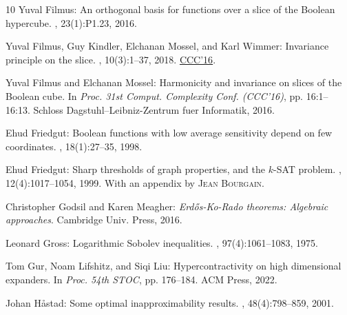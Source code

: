 \documentclass[11pt]{article}
\begin{document}
\begin{thebibliography}{10}
{\sc Yuval Filmus}: An orthogonal basis for functions over a slice of the
  {Boolean} hypercube.
, 23(1):P1.23, 2016.
\newblock [\epfmtdoi{10.37236/4567}]

{\sc Yuval Filmus, Guy Kindler, Elchanan Mossel, and Karl Wimmer}: Invariance
  principle on the slice.
, 10(3):1--37, 2018.
\newblock \prelim \href{https://doi.org/10.4230/LIPIcs.CCC.2016.15}{CCC'16}.
\newblock [\epfmtdoi{10.1145/3186590}]

{\sc Yuval Filmus and Elchanan Mossel}: Harmonicity and invariance on slices of
  the {Boolean} cube.
\newblock In {\em Proc. 31st Comput. Complexity Conf. (CCC'16)}, pp.
  16:1--16:13. Schloss Dagstuhl--Leibniz-Zentrum fuer Informatik, 2016.

{\sc Ehud Friedgut}: {Boolean} functions with low average sensitivity depend on
  few coordinates.
, 18(1):27--35, 1998.
\newblock [\epfmtdoi{10.1007/PL00009809}]

{\sc Ehud Friedgut}: Sharp thresholds of graph properties, and the {$k$}-{SAT}
  problem.
, 12(4):1017--1054, 1999.
\newblock With an appendix by \textsc{Jean Bourgain}.
\newblock [\epfmtdoi{10.1090/S0894-0347-99-00305-7}]

{\sc Christopher Godsil and Karen Meagher}: {\em Erd\H{o}s-Ko-Rado theorems:
  {A}lgebraic approaches}.
\newblock Cambridge Univ. Press, 2016.

{\sc Leonard Gross}: Logarithmic {S}obolev inequalities.
, 97(4):1061--1083, 1975.
\newblock [\epfmtdoi{10.2307/2373688}]

{\sc Tom Gur, Noam Lifshitz, and Siqi Liu}: Hypercontractivity on high
  dimensional expanders.
\newblock In {\em Proc. 54th STOC}, pp. 176--184. ACM Press, 2022.
\newblock [\epfmtdoi{10.1145/3519935.3520004}]

{\sc Johan H{\aa}stad}: Some optimal inapproximability results.
, 48(4):798--859, 2001.
\newblock [\epfmtdoi{10.1145/502090.502098}]


\end{thebibliography}
\end{document}
